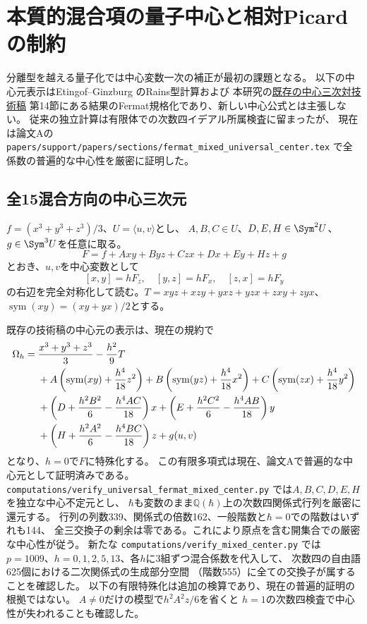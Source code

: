 \section{本質的混合項の量子中心と相対Picardの制約}
\label{sec:mixed-quantum-center}
分離型を越える量子化では中心変数一次の補正が最初の課題となる。
以下の中心元表示はEtingof--Ginzburg \cite[\S9]{EG} のRains型計算および
本研究の\href{https://github.com/uedakazushi/nc-cubic2/blob/main/papers/pdf-only/ambient/central_pair_formal_moduli.pdf}{既存の中心三次対技術稿}
第14節にある結果のFermat規格化であり、新しい中心公式とは主張しない。
従来の独立計算は有限体での次数四イデアル所属検査に留まったが、
現在は論文Aの
\texttt{papers/support/papers/sections/fermat\_mixed\_universal\_center.tex}
で全係数の普遍的な中心性を厳密に証明した。

\subsection{全15混合方向の中心三次元}
$f=(x^3+y^3+z^3)/3$、$U=\langle u,v\rangle$とし、
$A,B,C\in U$、$D,E,H\in\Sym^2U$、$g\in\Sym^3U$を任意に取る。
\begin{equation}\label{eq:full-mixed-fermat}
 F=f+Axy+Byz+Czx+Dx+Ey+Hz+g
\end{equation}
とおき、$u,v$を中心変数として
\begin{equation}\label{eq:full-mixed-brackets}
 [x,y]=hF_z,\quad[y,z]=hF_x,\quad[z,x]=hF_y
\end{equation}
の右辺を完全対称化して読む。$T=xyz+xzy+yxz+yzx+zxy+zyx$、
$\operatorname{sym}(xy)=(xy+yx)/2$とする。

\begin{remark}[既存原稿の全混合中心元と検算状態]\label{rem:full-mixed-center}
既存の技術稿の中心元の表示は、現在の規約で
\begin{align}\label{eq:full-mixed-center}
\Omega_h={}&\frac{x^3+y^3+z^3}{3}-\frac{h^2}{9}T\notag\\
&+A\left(\operatorname{sym}(xy)+\frac{h^4}{18}z^2\right)
 +B\left(\operatorname{sym}(yz)+\frac{h^4}{18}x^2\right)
 +C\left(\operatorname{sym}(zx)+\frac{h^4}{18}y^2\right)\notag\\
&+\left(D+\frac{h^2B^2}{6}-\frac{h^4AC}{18}\right)x
 +\left(E+\frac{h^2C^2}{6}-\frac{h^4AB}{18}\right)y\notag\\
&+\left(H+\frac{h^2A^2}{6}-\frac{h^4BC}{18}\right)z+g(u,v)
\end{align}
となり、$h=0$で$F$に特殊化する。
この有限多項式は現在、論文Aで普遍的な中心元として証明済みである。
\texttt{computations/verify\_universal\_fermat\_mixed\_center.py}
では$A,B,C,D,E,H$を独立な中心不定元とし、
$\hbar$も変数のまま$\mathbb Q(\hbar)$上の次数四関係式行列を厳密に還元する。
行列の列数339、関係式の倍数162、一般階数と$\hbar=0$での階数はいずれも144、
全三交換子の剰余は零である。これにより原点を含む開集合での厳密な中心性が従う。
新たな \texttt{computations/verify\_mixed\_center.py} では
$p=1009$、$h=0,1,2,5,13$、各$h$に3組ずつ混合係数を代入して、
次数四の自由語625個における二次関係式の生成部分空間
（階数555）に全ての交換子が属することを確認した。
以下の有限特殊化は追加の検算であり、現在の普遍的証明の根拠ではない。
$A\ne0$だけの模型で$h^2A^2z/6$を省くと
$h=1$の次数四検査で中心性が失われることも確認した。
\end{remark}

